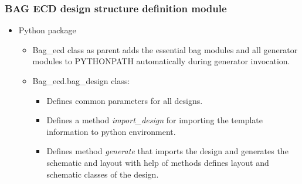 \documentclass[logo=bluequo,normaltitle]{aaltoslides}
\begin{document}
\begin{frame}[t]
    \frametitle{BAG ECD design structure definition module}
    \begin{minipage}{.68\linewidth}
            \begin{itemize}
                \item Python package
                    \begin{itemize}
                        \item Bag\_ecd class as parent adds the essential bag
                            modules and all generator modules to PYTHONPATH
                            automatically during generator invocation.
                        \item Bag\_ecd.bag\_design class:
                            \begin{itemize}
                                \item Defines common parameters for all
                                    designs.
                                \item Defines a method \emph{import\_design}  for importing the template
                                    information to python environment.
                                \item Defines method \emph{generate} that
                                    imports the design and generates the
                                    schematic and layout with help of methods
                                    defines layout
                                    and schematic classes of the design.
                            \end{itemize}
                    \end{itemize}
            \end{itemize}
        \end{minipage}
        \begin{minipage}{.28\linewidth}
\end{minipage}
\end{frame}
\end{document}
